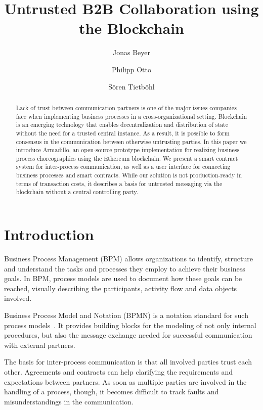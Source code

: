 \documentclass[runningheads]{llncs}
\begin{document}
%
\title{Untrusted B2B Collaboration using the Blockchain}
%
%
\author{Jonas Beyer \and Philipp Otto \and S\"oren Tietb\"ohl}
%
%
%
\maketitle %
%
\begin{abstract}
	Lack of trust between communication partners is one of the major issues companies face when implementing business processes in a cross-organizational setting.
	Blockchain is an emerging technology that enables decentralization and distribution of state without the need for a trusted central instance.
	As a result, it is possible to form consensus in the communication between otherwise untrusting parties.
	In this paper we introduce Armadillo, an open-source prototype implementation for realizing business process choreographies using the Ethereum blockchain.
	We present a smart contract system for inter-process communication, as well as a user interface for connecting business processes and smart contracts.
	While our solution is not production-ready in terms of transaction costs, it describes a basis for untrusted messaging via the blockchain without a central controlling party.

\end{abstract}
%
\section{Introduction}
Business Process Management (BPM) allows organizations to identify, structure and understand the tasks and processes they employ to achieve their business goals.
In BPM, process models are used to document how these goals can be reached, visually describing the participants, activity flow and data objects involved.

Business Process Model and Notation (BPMN) is a notation standard for such process models~\cite{omg2014bpmn}.
It provides building blocks for the modeling of not only internal procedures, but also the message exchange needed for successful communication with external partners.

The basis for inter-process communication is that all involved parties trust each other.
Agreements and contracts can help clarifying the requirements and expectations between partners.
As soon as multiple parties are involved in the handling of a process, though, it becomes difficult to track faults and misunderstandings in the communication.
\end{document}
